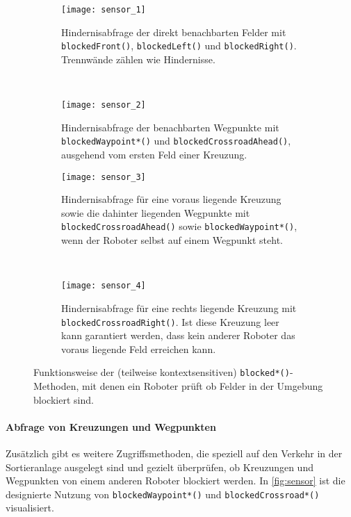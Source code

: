 \begin{figure}[t]
	\centering
	\begin{subfigure}[b]{0.45\textwidth}
		\centering
		\texttt{[image: sensor\_1]}
		\caption{Hindernisabfrage der direkt benachbarten Felder mit \texttt{blockedFront()}, \texttt{blockedLeft()} und \texttt{blockedRight()}. Trennwände zählen wie Hindernisse.}
		\label{fig:sensor_1}
	\end{subfigure}
	~~~~~
	\begin{subfigure}[b]{0.45\textwidth}
		\centering
		\texttt{[image: sensor\_2]}
		\caption{Hindernisabfrage der benachbarten Wegpunkte mit \texttt{blockedWaypoint*()} und \texttt{blockedCrossroadAhead()}, ausgehend vom ersten Feld einer Kreuzung.}
		\label{fig:sensor_2}
	\end{subfigure}
	\begin{subfigure}[b]{0.45\textwidth}
		\centering
		\vspace{1cm}
		\texttt{[image: sensor\_3]}
		\caption{Hindernisabfrage für eine voraus liegende Kreuzung sowie die dahinter liegenden Wegpunkte mit \texttt{blockedCrossroadAhead()} sowie \texttt{blockedWaypoint*()}, wenn der Roboter selbst auf einem Wegpunkt steht.}
		\label{fig:sensor_3}
	\end{subfigure}
	~~~~~
	\begin{subfigure}[b]{0.45\textwidth}
		\centering
		\vspace{1cm}
		\texttt{[image: sensor\_4]}
		\caption{Hindernisabfrage für eine rechts liegende Kreuzung mit \texttt{blockedCrossroadRight()}. Ist diese Kreuzung leer kann garantiert werden, dass kein anderer Roboter das voraus liegende Feld erreichen kann.}
		\label{fig:sensor_4}
		\vfill{}
	\end{subfigure}
	\caption{Funktionsweise der (teilweise kontextsensitiven) \texttt{blocked*()}-Methoden, mit denen ein Roboter prüft ob Felder in der Umgebung blockiert sind.}
	\label{fig:sensor}
\end{figure}


\paragraph{Abfrage von Kreuzungen und Wegpunkten}
Zusätzlich gibt es weitere Zugriffsmethoden, die speziell auf den Verkehr in der Sortieranlage ausgelegt sind und gezielt überprüfen, ob Kreuzungen und Wegpunkten von einem anderen Roboter blockiert werden. In \autoref{fig:sensor} ist die designierte Nutzung von \texttt{blockedWaypoint*()} und \texttt{blockedCrossroad*()} visualisiert.


